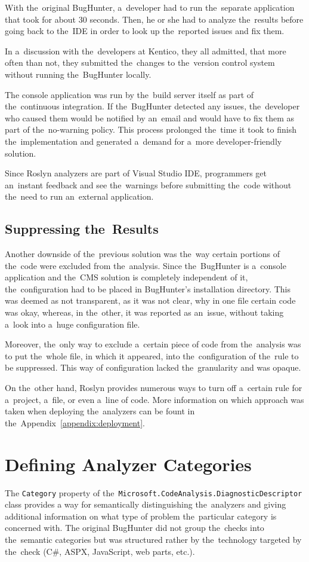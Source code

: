 \documentclass[
  digital, %
  table,   %
  lof,     %
  lot,     %
  oneside,
]{fithesis3}
\begin{document}
With the~original BugHunter, a~developer had to run the~separate application that took for about 30 seconds. Then, he or she had to analyze the~results before going back to the~IDE in order to look up the~reported issues and fix them. 

In a~discussion with the~developers at Kentico, they all admitted, that more often than not, they submitted the~changes to the~version control system without running the~BugHunter locally. 

The console application was run by the~build server itself as part of the~continuous integration. If the~BugHunter detected any issues, the~developer who caused them would be notified by an~email and would have to fix them as part of the~no-warning policy. This process prolonged the~time it took to finish the~implementation and generated a~demand for a~more developer-friendly solution. 

Since Roslyn analyzers are part of Visual Studio IDE, programmers get an~instant feedback and see the~warnings before submitting the~code without the~need to run an~external application.

\subsection{Suppressing the~Results}
Another downside of the~previous solution was the~way certain portions of the~code were excluded from the~analysis. Since the~BugHunter is a~console application and the~CMS solution is completely independent of it, the~configuration had to be placed in BugHunter's installation directory. This was deemed as not transparent, as it was not clear, why in one file certain code was okay, whereas, in the~other, it was reported as an~issue, without taking a~look into a~huge configuration file.

Moreover, the~only way to exclude a~certain piece of code from the~analysis was to put the~whole file, in which it appeared, into the~configuration of the~rule to be suppressed. This way of configuration lacked the~granularity and was opaque. 

On the~other hand, Roslyn provides numerous ways to turn off a~certain rule for a~project, a~file, or even a~line of code. More information on which approach was taken when deploying the~analyzers can be fount in the~Appendix~\ref{appendix:deployment}.

\section{Defining Analyzer Categories}
\label{sec:analyzer-categories}
The \texttt{Category} property of the~\texttt{Microsoft.CodeAnalysis.DiagnosticDescriptor} class provides a way for semantically distinguishing the~analyzers and giving additional information on what type of problem the~particular category is concerned with. The original BugHunter did not group the~checks into the~semantic categories but was structured rather by the~technology targeted by the~check (C\#, ASPX, JavaScript, web parts, etc.). 
\end{document}
